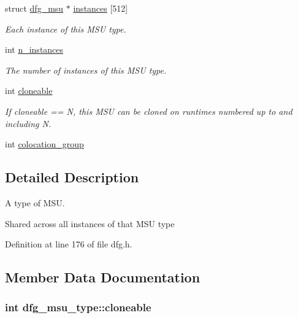 \begin{DoxyCompactItemize}
struct \hyperlink{structdfg__msu}{dfg\-\_\-msu} $\ast$ \hyperlink{structdfg__msu__type_aac780324344ec376a3dc3d18704ca7c6}{instances} \mbox{[}512\mbox{]}
\begin{DoxyCompactList}\small\item\em Each instance of this M\-S\-U type. \end{DoxyCompactList}\item 
int \hyperlink{structdfg__msu__type_ae98668b711040cd8cb5d537bb9a3f0cd}{n\-\_\-instances}
\begin{DoxyCompactList}\small\item\em The number of instances of this M\-S\-U type. \end{DoxyCompactList}\item 
int \hyperlink{structdfg__msu__type_a21fd4fb5929221c5420e32f54507b33c}{cloneable}
\begin{DoxyCompactList}\small\item\em If cloneable == N, this M\-S\-U can be cloned on runtimes numbered up to and including N. \end{DoxyCompactList}\item 
int \hyperlink{structdfg__msu__type_ac40772c8600420c05ee16ff9ea527c95}{colocation\-\_\-group}
\end{DoxyCompactItemize}


\subsection{Detailed Description}
A type of M\-S\-U. 

Shared across all instances of that M\-S\-U type 

Definition at line 176 of file dfg.\-h.



\subsection{Member Data Documentation}
\hypertarget{structdfg__msu__type_a21fd4fb5929221c5420e32f54507b33c}{
\subsubsection[{cloneable}]{\setlength{\rightskip}{0pt plus 5cm}int dfg\-\_\-msu\-\_\-type\-::cloneable}}\label{structdfg__msu__type_a21fd4fb5929221c5420e32f54507b33c}


